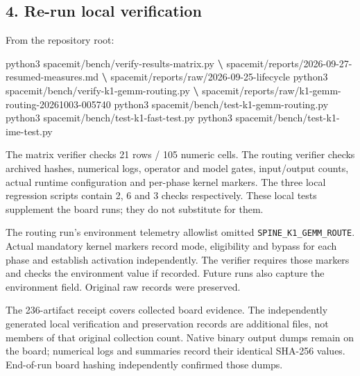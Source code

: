 \documentclass[10pt,a4paper]{article}
\newenvironment{Shaded}{}{}
\newcommand{\ExtensionTok}[1]{#1}
\newcommand{\KeywordTok}[1]{\textcolor[rgb]{0.00,0.44,0.13}{\textbf{#1}}}
\newcommand{\NormalTok}[1]{#1}
\begin{document}
\hypertarget{re-run-local-verification}{%
\subsection{4. Re-run local
verification}\label{re-run-local-verification}}

From the repository root:

\begin{Shaded}
\begin{Highlighting}[]
\ExtensionTok{python3}\NormalTok{ spacemit/bench/verify{-}results{-}matrix.py }\KeywordTok{\textbackslash{}}
  \ExtensionTok{spacemit/reports/2026{-}09{-}27{-}resumed{-}measures.md} \KeywordTok{\textbackslash{}}
  \ExtensionTok{spacemit/reports/raw/2026{-}09{-}25{-}lifecycle}
\ExtensionTok{python3}\NormalTok{ spacemit/bench/verify{-}k1{-}gemm{-}routing.py }\KeywordTok{\textbackslash{}}
  \ExtensionTok{spacemit/reports/raw/k1{-}gemm{-}routing{-}20261003{-}005740}
\ExtensionTok{python3}\NormalTok{ spacemit/bench/test{-}k1{-}gemm{-}routing.py}
\ExtensionTok{python3}\NormalTok{ spacemit/bench/test{-}k1{-}fast{-}test.py}
\ExtensionTok{python3}\NormalTok{ spacemit/bench/test{-}k1{-}ime{-}test.py}
\end{Highlighting}
\end{Shaded}

The matrix verifier checks 21 rows / 105 numeric cells. The routing
verifier checks archived hashes, numerical logs, operator and model
gates, input/output counts, actual runtime configuration and per-phase
kernel markers. The three local regression scripts contain 2, 6 and 3
checks respectively. These local tests supplement the board runs; they
do not substitute for them.

The routing run's environment telemetry allowlist omitted
\nolinkurl{SPINE_K1_GEMM_ROUTE}. Actual mandatory kernel markers record
mode, eligibility and bypass for each phase and establish activation
independently. The verifier requires those markers and checks the
environment value if recorded. Future runs also capture the environment
field. Original raw records were preserved.

The 236-artifact receipt covers collected board evidence. The
independently generated local verification and preservation records are
additional files, not members of that original collection count. Native
binary output dumps remain on the board; numerical logs and summaries
record their identical SHA-256 values. End-of-run board hashing
independently confirmed those dumps.
\end{document}
